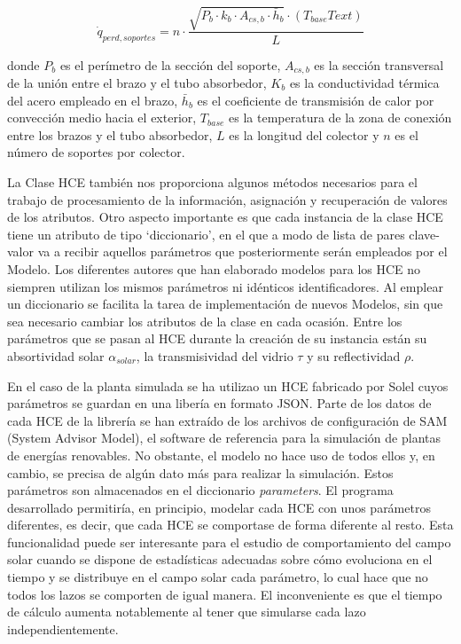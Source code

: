 \documentclass[12pt]{report} %
\begin{document}
\begin{equation}
   \dot q_{perd,soportes} =  n \cdot \frac{\sqrt{P_b \cdot k_b \cdot A_{cs,b} \cdot \bar h_b} \cdot (T_{base}T{ext})}{L}
    \label{eq:qperdidassoportes}
\end{equation}

donde \(P_b\) es el perímetro de la sección del soporte, \(A_{cs,b}\) es la sección transversal de la unión entre el brazo y el tubo absorbedor, \(K_b\) es la conductividad térmica del acero empleado en el brazo, \(\bar h_b\) es el coeficiente de transmisión de calor por convección medio hacia el exterior, \(T_{base}\) es la temperatura de la zona de conexión entre los brazos y el tubo absorbedor, \(L\) es la longitud del colector y \(n\) es el número de soportes por colector.

La Clase HCE también nos proporciona algunos métodos necesarios para el trabajo de procesamiento de la información, asignación y recuperación de valores de los atributos. Otro aspecto importante es que cada instancia de la clase HCE tiene un
atributo de tipo `diccionario', en el que a modo de lista de pares clave-valor va a recibir aquellos parámetros que posteriormente serán empleados por el Modelo. Los diferentes autores que han elaborado modelos para los HCE no siempren utilizan los mismos parámetros ni idénticos identificadores. Al emplear un diccionario se facilita la tarea de implementación de nuevos Modelos, sin que sea necesario cambiar los atributos de la clase en cada ocasión. Entre los parámetros que se
pasan al HCE durante la creación de su instancia están su absortividad solar \(\alpha_{solar}\), la transmisividad del vidrio \(\tau\) y su reflectividad \(\rho\).

En el caso de la planta simulada se ha utilizao un HCE fabricado por Solel cuyos parámetros se guardan en una libería en formato JSON. Parte de los datos de cada HCE de la librería se han extraído de los archivos de configuración de SAM (System Advisor Model), el software de referencia para la simulación de plantas de energías renovables. No obstante, el modelo no hace uso de todos ellos y, en cambio, se precisa de algún dato más para realizar la simulación. Estos parámetros son
almacenados en el diccionario \emph{parameters}. El programa desarrollado permitiría, en principio, modelar cada HCE con unos parámetros diferentes, es decir, que cada HCE se comportase de forma diferente al resto. Esta funcionalidad puede ser interesante para el estudio de comportamiento del campo solar cuando se dispone de estadísticas adecuadas sobre cómo evoluciona en el tiempo y se distribuye en el campo solar cada parámetro, lo cual hace que no todos los lazos se comporten de igual manera. El inconveniente es que el tiempo de cálculo aumenta notablemente al tener que simularse cada lazo independientemente. 
\end{document}
